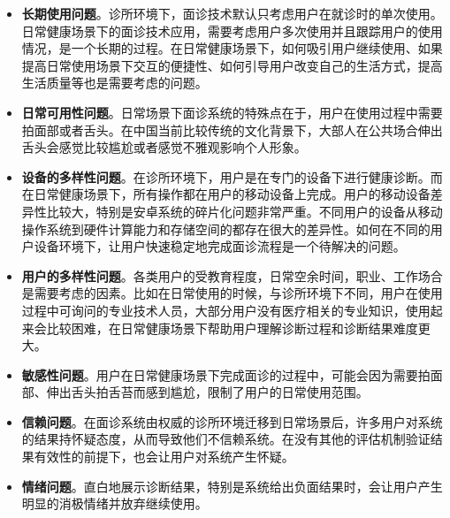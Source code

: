 \begin{itemize}
    
    \item \textbf{长期使用问题}。诊所环境下，面诊技术默认只考虑用户在就诊时的单次使用。日常健康场景下的面诊技术应用，需要考虑用户多次使用并且跟踪用户的使用情况，是一个长期的过程。在日常健康场景下，如何吸引用户继续使用、如果提高日常使用场景下交互的便捷性、如何引导用户改变自己的生活方式，提高生活质量等也是需要考虑的问题。
    
    \item \textbf{日常可用性问题}。日常场景下面诊系统的特殊点在于，用户在使用过程中需要拍面部或者舌头。在中国当前比较传统的文化背景下，大部人在公共场合伸出舌头会感觉比较尴尬或者感觉不雅观影响个人形象。

    \item \textbf{设备的多样性问题}。在诊所环境下，用户是在专门的设备下进行健康诊断。而在日常健康场景下，所有操作都在用户的移动设备上完成。用户的移动设备差异性比较大，特别是安卓系统的碎片化问题非常严重。不同用户的设备从移动操作系统到硬件计算能力和存储空间的都存在很大的差异性。如何在不同的用户设备环境下，让用户快速稳定地完成面诊流程是一个待解决的问题。
    
    \item \textbf{用户的多样性问题}。各类用户的受教育程度，日常空余时间，职业、工作场合是需要考虑的因素。比如在日常使用的时候，与诊所环境下不同，用户在使用过程中可询问的专业技术人员，大部分用户没有医疗相关的专业知识，使用起来会比较困难，在日常健康场景下帮助用户理解诊断过程和诊断结果难度更大。
    
    \item \textbf{敏感性问题}。用户在日常健康场景下完成面诊的过程中，可能会因为需要拍面部、伸出舌头拍舌苔而感到尴尬，限制了用户的日常使用范围。
    
    \item \textbf{信赖问题}。在面诊系统由权威的诊所环境迁移到日常场景后，许多用户对系统的结果持怀疑态度，从而导致他们不信赖系统。在没有其他的评估机制验证结果有效性的前提下，也会让用户对系统产生怀疑。
    
    \item \textbf{情绪问题}。直白地展示诊断结果，特别是系统给出负面结果时，会让用户产生明显的消极情绪并放弃继续使用。 

\end{itemize}

